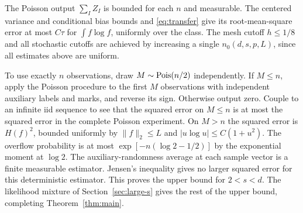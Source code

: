 The Poisson output \(\sum_I Z_I\) is bounded for each \(n\)
and measurable. The centered variance and conditional bias
bounds and \eqref{eq:transfer} give its root-mean-square
error at most \(C\tau\) for \(\int f\log f\), uniformly
over the class. The mesh cutoff \(h\le1/8\) and all
stochastic cutoffs are achieved by increasing a single
\(n_0(d,s,p,L)\), since all estimates above are uniform.

To use exactly \(n\) observations, draw \(M\sim\operatorname{Pois}(n/2)\)
independently. If \(M\le n\), apply the Poisson procedure to
the first \(M\) observations with independent auxiliary labels
and marks, and reverse its sign. Otherwise output zero.
Couple to an infinite iid sequence to see that the squared
error on \(M\le n\) is at most the squared error in the
complete Poisson experiment. On \(M>n\) the squared error
is \(H(f)^2\), bounded uniformly by \(\|f\|_2\le L\) and
\(|u\log u|\le C(1+u^2)\). The overflow probability is at most
\(\exp[-n(\log 2-1/2)]\) by the exponential moment at
\(\log 2\). The auxiliary-randomness average at each sample
vector is a finite measurable estimator. Jensen's inequality
gives no larger squared error for this deterministic estimator.
This proves the upper bound for \(2<s<d\). The likelihood
mixture of Section~\ref{sec:large-s} gives the rest of the
upper bound, completing Theorem~\ref{thm:main}.
